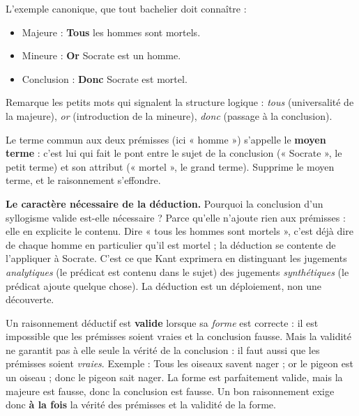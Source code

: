 \documentclass[11pt]{article}
\begin{document}
L'exemple canonique, que tout bachelier doit connaître :

\begin{exemplebox}
\begin{itemize}
\item Majeure : \textbf{Tous} les hommes sont mortels.
\item Mineure : \textbf{Or} Socrate est un homme.
\item Conclusion : \textbf{Donc} Socrate est mortel.
\end{itemize}
Remarque les petits mots qui signalent la structure logique : \emph{tous} (universalité de la majeure), \emph{or} (introduction de la mineure), \emph{donc} (passage à la conclusion).
\end{exemplebox}

Le terme commun aux deux prémisses (ici « homme ») s'appelle le \textbf{moyen terme} : c'est lui qui fait le pont entre le sujet de la conclusion (« Socrate », le petit terme) et son attribut (« mortel », le grand terme). Supprime le moyen terme, et le raisonnement s'effondre.

\textbf{Le caractère nécessaire de la déduction.} Pourquoi la conclusion d'un syllogisme valide est-elle nécessaire ? Parce qu'elle n'ajoute rien aux prémisses : elle en explicite le contenu. Dire « tous les hommes sont mortels », c'est déjà dire de chaque homme en particulier qu'il est mortel ; la déduction se contente de l'appliquer à Socrate. C'est ce que Kant exprimera en distinguant les jugements \emph{analytiques} (le prédicat est contenu dans le sujet) des jugements \emph{synthétiques} (le prédicat ajoute quelque chose). La déduction est un déploiement, non une découverte.

\begin{propriete}
Un raisonnement déductif est \textbf{valide} lorsque sa \emph{forme} est correcte : il est impossible que les prémisses soient vraies et la conclusion fausse. Mais la validité ne garantit pas à elle seule la vérité de la conclusion : il faut aussi que les prémisses soient \emph{vraies}. Exemple : \guillemotleft Tous les oiseaux savent nager ; or le pigeon est un oiseau ; donc le pigeon sait nager. \guillemotright La forme est parfaitement valide, mais la majeure est fausse, donc la conclusion est fausse. Un bon raisonnement exige donc \textbf{à la fois} la vérité des prémisses et la validité de la forme.
\end{propriete}
\end{document}
